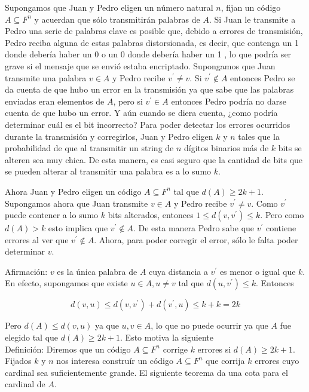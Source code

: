 \documentclass[10pt]{article}
\begin{document}
Supongamos que Juan y Pedro eligen un número natural $n$, fijan un código $A \subseteq F^{n}$ y acuerdan que sólo transmitirán palabras de $A$. Si Juan le transmite a Pedro una serie de palabras clave es posible que, debido a errores de transmisión, Pedro reciba alguna de estas palabras distorsionada, es decir, que contenga un 1 donde debería haber un 0 o un 0 donde debería haber un 1 , lo que podría ser grave si el mensaje que se envió estaba encriptado. Supongamos que Juan transmite una palabra $v \in A$ y Pedro recibe $v^{\prime} \neq v$. Si $v^{\prime} \notin A$ entonces Pedro se da cuenta de que hubo un error en la transmisión ya que sabe que las palabras enviadas eran elementos de $A$, pero si $v^{\prime} \in A$ entonces Pedro podría no darse cuenta de que hubo un error. Y aún cuando se diera cuenta, ¿como podría determinar cuál es el bit incorrecto? Para poder detectar los errores ocurridos durante la transmisión y corregirlos, Juan y Pedro eligen $k$ y $n$ tales que la probabilidad de que al transmitir un string de $n$ dígitos binarios más de $k$ bits se alteren sea muy chica. De esta manera, es casi seguro que la cantidad de bits que se pueden alterar al transmitir una palabra es a lo sumo $k$.

Ahora Juan y Pedro eligen un código $A \subseteq F^{n}$ tal que $d(A) \geq 2 k+1$. Supongamos ahora que Juan transmite $v \in A$ y Pedro recibe $v^{\prime} \neq v$. Como $v^{\prime}$ puede contener a lo sumo $k$ bits alterados, entonces $1 \leq d\left(v, v^{\prime}\right) \leq k$. Pero como $d(A)>k$ esto implica que $v^{\prime} \notin A$. De esta manera Pedro sabe que $v^{\prime}$ contiene errores al ver que $v^{\prime} \notin A$. Ahora, para poder corregir el error, sólo le falta poder determinar $v$.

Afirmación: $v$ es la única palabra de $A$ cuya distancia a $v^{\prime}$ es menor o igual que $k$. En efecto, supongamos que existe $u \in A, u \neq v$ tal que $d\left(u, v^{\prime}\right) \leq k$. Entonces

$$
d(v, u) \leq d\left(v, v^{\prime}\right)+d\left(v^{\prime}, u\right) \leq k+k=2 k
$$

Pero $d(A) \leq d(v, u)$ ya que $u, v \in A$, lo que no puede ocurrir ya que $A$ fue elegido tal que $d(A) \geq 2 k+1$. Esto motiva la siguiente\\
Definición: Diremos que un código $A \subseteq F^{n}$ corrige $k$ errores si $d(A) \geq 2 k+1$.\\
Fijados $k$ y $n$ nos interesa construír un código $A \subseteq F^{n}$ que corrija $k$ errores cuyo cardinal sea suficientemente grande. El siguiente teorema da una cota para el cardinal de $A$.
\end{document}

